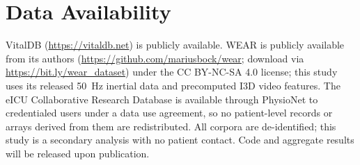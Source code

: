 \section*{Data Availability}
VitalDB \cite{ref20} (\url{https://vitaldb.net}) is publicly available. WEAR
\cite{ref21} is publicly available from its authors
(\url{https://github.com/mariusbock/wear}; download via
\url{https://bit.ly/wear_dataset}) under the CC BY-NC-SA 4.0 license; this
study uses its released 50~Hz inertial data and precomputed I3D video features.
The eICU Collaborative Research Database \cite{ref27} is
available through PhysioNet \cite{ref28} to credentialed users under a data
use agreement, so no patient-level records or arrays derived from them are
redistributed. All corpora are de-identified; this study is a secondary
analysis with no patient contact. Code and aggregate results will be released
upon publication.


